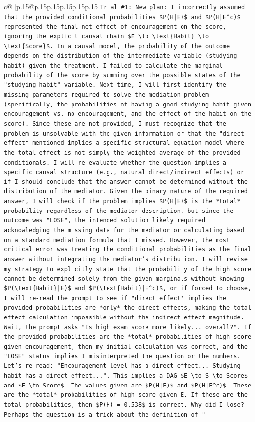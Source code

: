 \documentclass{article}
\begin{document}
{\begin{supertabular}{c@{$\;$}|p{.15\linewidth}@{}p{.15\linewidth}p{.15\linewidth}p{.15\linewidth}p{.15\linewidth}p{.15\linewidth}}
{{{\texttt{Trial \#1: New plan: I incorrectly assumed that the provided conditional probabilities \$P(H|E)\$ and \$P(H|E\^{}c)\$ represented the final net effect of encouragement on the score, ignoring the explicit causal chain \$E \textbackslash{}to \textbackslash{}text\{Habit\} \textbackslash{}to \textbackslash{}text\{Score\}\$. In a causal model, the probability of the outcome depends on the distribution of the intermediate variable (studying habit) given the treatment. I failed to calculate the marginal probability of the score by summing over the possible states of the "studying habit" variable. Next time, I will first identify the missing parameters required to solve the mediation problem (specifically, the probabilities of having a good studying habit given encouragement vs. no encouragement, and the effect of the habit on the score). Since these are not provided, I must recognize that the problem is unsolvable with the given information or that the "direct effect" mentioned implies a specific structural equation model where the total effect is not simply the weighted average of the provided conditionals. I will re{-}evaluate whether the question implies a specific causal structure (e.g., natural direct/indirect effects) or if I should conclude that the answer cannot be determined without the distribution of the mediator. Given the binary nature of the required answer, I will check if the problem implies \$P(H|E)\$ is the *total* probability regardless of the mediator description, but since the outcome was "LOSE", the intended solution likely required acknowledging the missing data for the mediator or calculating based on a standard mediation formula that I missed. However, the most critical error was treating the conditional probabilities as the final answer without integrating the mediator's distribution. I will revise my strategy to explicitly state that the probability of the high score cannot be determined solely from the given marginals without knowing \$P(\textbackslash{}text\{Habit\}|E)\$ and \$P(\textbackslash{}text\{Habit\}|E\^{}c)\$, or if forced to choose, I will re{-}read the prompt to see if "direct effect" implies the provided probabilities are *only* the direct effects, making the total effect calculation impossible without the indirect effect magnitude. Wait, the prompt asks "Is high exam score more likely... overall?". If the provided probabilities are the *total* probabilities of high score given encouragement, then my initial calculation was correct, and the "LOSE" status implies I misinterpreted the question or the numbers. Let's re{-}read: "Encouragement level has a direct effect... Studying habit has a direct effect...". This implies a DAG \$E \textbackslash{}to S \textbackslash{}to Score\$ and \$E \textbackslash{}to Score\$. The values given are \$P(H|E)\$ and \$P(H|E\^{}c)\$. These are the *total* probabilities of high score given E. If these are the total probabilities, then \$P(H) = 0.538\$ is correct. Why did I lose? Perhaps the question is a trick about the definition of "} \\
}}}
\end{supertabular}}
\end{document}
